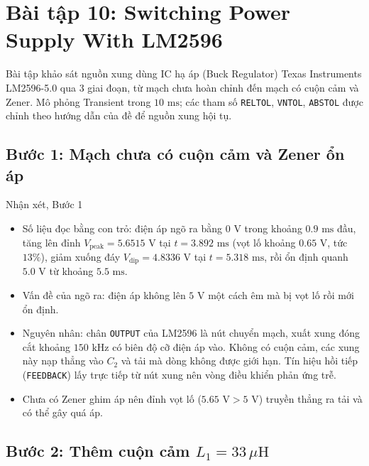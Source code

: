 \section{Bài tập 10: Switching Power Supply With LM2596}

Bài tập khảo sát nguồn xung dùng IC hạ áp (Buck Regulator) Texas Instruments LM2596-5.0 qua 3 giai đoạn, từ mạch chưa hoàn chỉnh đến mạch có cuộn cảm và Zener. Mô phỏng Transient trong $10\text{ ms}$; các tham số \texttt{RELTOL}, \texttt{VNTOL}, \texttt{ABSTOL} được chỉnh theo hướng dẫn của đề để nguồn xung hội tụ.

\Needspace{0.4\textheight}
\subsection{Bước 1: Mạch chưa có cuộn cảm và Zener ổn áp}

\simresult
{}

\begin{notebox}{Nhận xét, Bước 1}
  \begin{itemize}[leftmargin=1.5em,itemsep=2pt,topsep=2pt]
    \item Số liệu đọc bằng con trỏ: điện áp ngõ ra bằng $0\text{ V}$ trong khoảng $0.9\text{ ms}$ đầu, tăng lên đỉnh $V_{\text{peak}} = 5.6515\text{ V}$ tại $t = 3.892\text{ ms}$ (vọt lố khoảng $0.65\text{ V}$, tức $13\%$), giảm xuống đáy $V_{\text{dip}} = 4.8336\text{ V}$ tại $t = 5.318\text{ ms}$, rồi ổn định quanh $5.0\text{ V}$ từ khoảng $5.5\text{ ms}$.
    \item Vấn đề của ngõ ra: điện áp không lên $5\text{ V}$ một cách êm mà bị vọt lố rồi mới ổn định.
    \item Nguyên nhân: chân \texttt{OUTPUT} của LM2596 là nút chuyển mạch, xuất xung đóng cắt khoảng $150\text{ kHz}$ có biên độ cỡ điện áp vào. Không có cuộn cảm, các xung này nạp thẳng vào $C_2$ và tải mà dòng không được giới hạn. Tín hiệu hồi tiếp (\texttt{FEEDBACK}) lấy trực tiếp từ nút xung nên vòng điều khiển phản ứng trễ.
    \item Chưa có Zener ghim áp nên đỉnh vọt lố ($5.65\text{ V} > 5\text{ V}$) truyền thẳng ra tải và có thể gây quá áp.
  \end{itemize}
\end{notebox}

\Needspace{0.4\textheight}
\subsection{Bước 2: Thêm cuộn cảm \texorpdfstring{$L_1 = 33\,\mu\text{H}$}{L1 = 33uH}}

